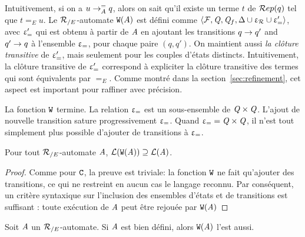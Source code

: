 Intuitivement, si on a $u \rightarrow^=_{A} q$, alors on sait qu'il existe
un terme $t$ de $\mathcal R ep(q)$ tel que $t =_E u$. Le ${\mathcal R_{/E}}$-automate
$\mathtt{W}(A)$ est défini comme $\langle \mathcal{F}, \mathit Q, \mathit Q_f, \Delta \cup \upvarepsilon_{\mathcal R} \cup \upvarepsilon_{=}' \rangle$,
avec $\upvarepsilon_{=}'$ qui est obtenu à partir de $\mathit A$ en ajoutant les transitions $q \rightarrow q'$ and $q'
\rightarrow q$ à  l'ensemble $\upvarepsilon_{=}$, pour chaque paire $(q, q')$. On maintient aussi {\em
  la clôture transitive} de  $\upvarepsilon_{=}'$, mais seulement pour les couples d'états distincts.
Intuitivement, la clôture transitive de $\upvarepsilon_{=}'$ correspond à expliciter la
clôture transitive des termes qui sont équivalents par $=_E$.  Comme montré dans la
section~\ref{sec:refinement}, cet aspect est important pour raffiner avec précision.


\begin{remark}
  La fonction $\mathtt{W}$ termine. La relation $\upvarepsilon_{=}$ est un sous-ensemble de $\mathit Q \times \mathit Q$.
  L'ajout de nouvelle transition sature progressivement $\upvarepsilon_{=}$. Quand $\upvarepsilon_{=} = \mathit Q \times \mathit Q$,
  il n'est tout simplement plus possible d'ajouter de transitions à $\upvarepsilon_{=}$.
\end{remark}



\begin{lemma}
  Pour tout ${\mathcal R_{/E}}$-automate $\mathit A$, $\mathcal{L}(\mathtt{W}(\mathit A)) \supseteq \mathcal{L}(\mathit A)$.
\end{lemma}
\begin{proof}
Comme pour $\mathtt{C}$, la preuve est triviale: la fonction $\mathtt{W}$ ne fait qu'ajouter des transitions, 
ce qui ne restreint en aucun cas le langage reconnu. Par conséquent, un critère syntaxique sur l'inclusion
des ensembles d'états et de transitions est suffisant : toute exécution de $\mathit A$ peut être rejouée par $\mathtt{W}(\mathit A)$
\end{proof}


\begin{lemma}
  Soit $\mathit A$ un ${\mathcal R_{/E}}$-automate. Si $\mathit A$ est bien défini, alors $\mathtt{W}(\mathit A)$ l'est aussi.
\end{lemma}

